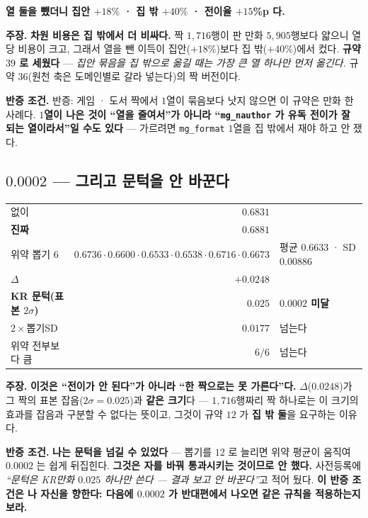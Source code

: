 \documentclass[10pt,a4paper]{article}
\newcommand{\claim}[2]{\begin{claimbox}\textbf{주장.} #1\par\smallskip
  \textcolor{gray!70}{\textbf{반증 조건.} #2}\end{claimbox}}
\begin{document}
\textbf{열 둘을 뺐더니 집안 $+18\%$ · 집 밖 $+40\%$ · 전이율 $+15$\%p 다.}

\claim{\textbf{차원 비용은 집 밖에서 더 비싸다.} 짝 $1{,}716$행이 판 만화 $5{,}905$행보다
얇으니 열당 비용이 크고, 그래서 열을 뺀 이득이 집안($+18\%$)보다 집 밖($+40\%$)에서
컸다. \textbf{규약 $39$ 로 세웠다} --- \emph{집안 묶음을 집 밖으로 옮길 때는 가장 큰 열
하나만 먼저 옮긴다.} 규약 $36$(원천 축은 도메인별로 갈라 넣는다)의 짝 버전이다.}
{반증: 게임 · 도서 짝에서 $1$열이 묶음보다 낫지 않으면 이 규약은 만화 한 사례다.
\textbf{$1$열이 나은 것이 ``열을 줄여서''가 아니라 ``\texttt{mg\_nauthor} 가 유독
전이가 잘 되는 열이라서''일 수도 있다} --- 가르려면 \texttt{mg\_format} $1$열을
집 밖에서 재야 하고 안 쟀다.}

\subsection*{$0.0002$ --- 그리고 문턱을 안 바꾼다}

\begin{center}
\begin{tabular}{lrl}
\toprule
없이 & $0.6831$ & \\
\textbf{진짜} & $\mathbf{0.6881}$ & \\
위약 뽑기 $6$ & $0.6736 \cdot 0.6600 \cdot 0.6533 \cdot 0.6538 \cdot 0.6716 \cdot 0.6673$ & 평균 $0.6633$ · SD $0.00886$ \\
\midrule
$\Delta$ & $\mathbf{+0.0248}$ & \\
\textbf{KR 문턱(표본 $2\sigma$)} & $0.025$ & \textcolor{BrickRed}{\textbf{$0.0002$ 미달}} \\
$2\times$뽑기SD & $0.0177$ & 넘는다 \\
위약 전부보다 큼 & $6/6$ & 넘는다 \\
\bottomrule
\end{tabular}
\end{center}

\claim{\textbf{이것은 ``전이가 안 된다''가 아니라 ``한 짝으로는 못 가른다''다.}
$\Delta$($0.0248$)가 그 짝의 표본 잡음($2\sigma = 0.025$)과 \textbf{같은 크기}다 ---
$1{,}716$행짜리 짝 하나로는 이 크기의 효과를 잡음과 구분할 수 없다는 뜻이고,
그것이 규약 $12$ 가 \textbf{집 밖 둘}을 요구하는 이유다.}
{\textbf{나는 문턱을 넘길 수 있었다} --- 뽑기를 $12$ 로 늘리면 위약 평균이 움직여
$0.0002$ 는 쉽게 뒤집힌다. \textbf{그것은 자를 바꿔 통과시키는 것이므로 안 했다.}
사전등록에 \emph{``문턱은 KR만화 $0.025$ 하나만 쓴다 --- 결과 보고 안 바꾼다''}고
적어 뒀다. \textbf{이 반증 조건은 나 자신을 향한다: 다음에 $0.0002$ 가 반대편에서 나오면
같은 규칙을 적용하는지 보라.}}
\end{document}
